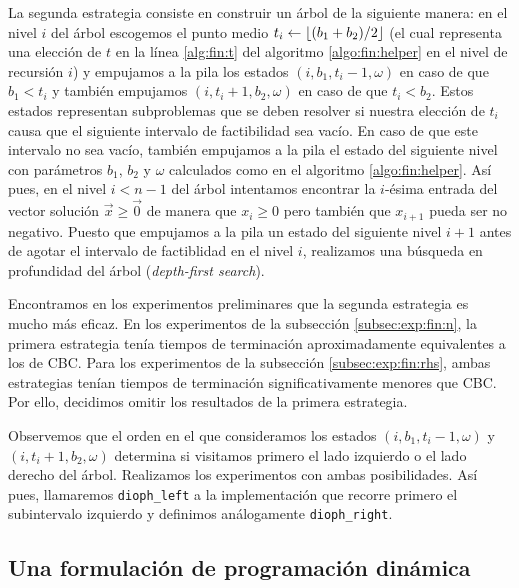 La segunda estrategia consiste en construir un árbol de la siguiente manera: en el nivel $i$ del
árbol escogemos el punto medio $t_i \leftarrow \left\lfloor (b_1 + b_2)/2 \right\rfloor$ (el cual representa una
elección de $t$ en la línea \ref{alg:fin:t} del algoritmo \ref{algo:fin:helper} en el nivel de
recursión $i$) y empujamos a la pila los estados $(i, b_1, t_i - 1, \omega)$ en caso de que $b_1 < t_i$ y
también empujamos $(i, t_i + 1, b_2, \omega)$ en caso de que $t_i < b_2$. Estos estados representan
subproblemas que se deben resolver si nuestra elección de $t_i$ causa que el siguiente intervalo de
factibilidad sea vacío. En caso de que este intervalo no sea vacío, también empujamos a la pila el
estado del siguiente nivel con parámetros $b_1$, $b_2$ y $\omega$ calculados como en el algoritmo
\ref{algo:fin:helper}. Así pues, en el nivel $i < n - 1$ del árbol intentamos encontrar la $i$-ésima entrada
del vector solución $\vec{x} \geq \vec{0}$ de manera que $x_i \geq 0$ pero también que $x_{i + 1}$
pueda ser no negativo. Puesto que empujamos a la pila un estado del siguiente nivel $i + 1$ antes de
agotar el intervalo de factiblidad en el nivel $i$, realizamos una búsqueda en profundidad del
árbol (\textit{depth-first search}).

Encontramos en los experimentos preliminares que la segunda estrategia es mucho más eficaz. En
los experimentos de la subsección \ref{subsec:exp:fin:n}, la primera estrategia tenía tiempos de
terminación aproximadamente equivalentes a los de CBC. Para los experimentos de la subsección
\ref{subsec:exp:fin:rhs}, ambas estrategias tenían tiempos de terminación significativamente menores
que CBC. Por ello, decidimos omitir los resultados de la primera estrategia.

Observemos que el orden en el que consideramos los estados $(i, b_1, t_i - 1, \omega)$ y $(i, t_i +
1, b_2, \omega)$ determina si visitamos primero el lado izquierdo o el lado derecho del árbol.
Realizamos los experimentos con ambas posibilidades. Así pues, llamaremos \texttt{dioph\_left} a la
implementación que recorre primero el subintervalo izquierdo y definimos análogamente
\texttt{dioph\_right}.

\subsection{Una formulación de programación dinámica}
\label{subsec:fin:dp}

